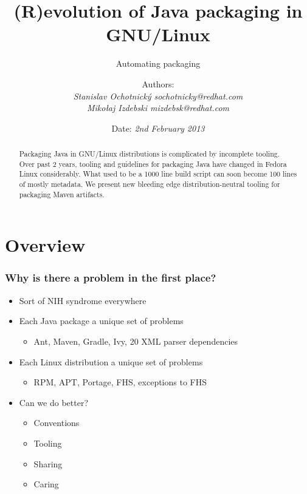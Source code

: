 \documentclass[pdftex,unicode,xcolor=table]{beamer}
\title{(R)evolution of Java packaging in GNU/Linux}
\subtitle{Automating packaging}
\author{Authors: \\
  \em{Stanislav Ochotnický} sochotnicky@redhat.com\\
  \em{Mikołaj Izdebski} mizdebsk@redhat.com}
\date{Date: \em{2nd February 2013}}
\begin{document}
 {
  \maketitle
  \newpage
}

\begin{rhbg}
  \begin{frame}
    \titlepage
    \begin{abstract}
      Packaging Java in GNU/Linux distributions is complicated by incomplete
      tooling. Over past 2 years, tooling and guidelines for packaging Java have
      changed in Fedora Linux considerably. What used to be a 1000 line build
      script can soon become 100 lines of mostly metadata.  We present new
      bleeding edge distribution-neutral tooling for packaging Maven artifacts.
    \end{abstract}
  \end{frame}
\end{rhbg}


\section{Overview}
\Large
\begin{frame}
  \frametitle{Why is there a problem in the first place?}
  \begin{itemize}
  \item Sort of NIH syndrome everywhere
  \item Each Java package a unique set of problems
    \begin{itemize}
      \item Ant, Maven, Gradle, Ivy, 20 XML parser dependencies
    \end{itemize}
  \item Each Linux distribution a unique set of problems
    \begin{itemize}
      \item RPM, APT, Portage, FHS, exceptions to FHS
    \end{itemize}
  \item Can we do better?
    \begin{itemize}
      \item Conventions
      \item Tooling
      \item Sharing
      \item Caring
    \end{itemize}
  \end{itemize}
\end{frame}
\end{document}
